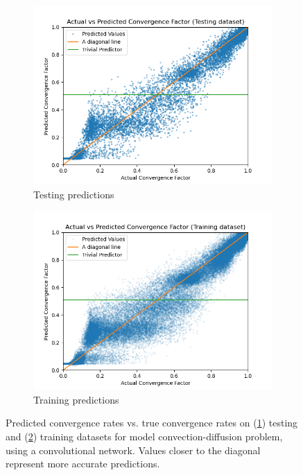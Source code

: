 \documentclass[review]{siamart190516}
\begin{document}
\begin{figure}[h]
  \centering
  \begin{subfigure}{.48\textwidth}
    \includegraphics[width=\textwidth]{figs/cd_conv_test_pred.png}
    \caption{Testing predictions}
    \label{subfig:cd_conv_test}
  \end{subfigure}
  \begin{subfigure}{.48\textwidth}
    \includegraphics[width=\textwidth]{figs/cd_conv_train_pred.png}
    \caption{Training predictions}
    \label{subfig:cd_conv_train}
  \end{subfigure}
  \caption{Predicted convergence rates vs. true convergence rates on (\ref{subfig:cd_conv_test}) testing and (\ref{subfig:cd_conv_train}) training datasets for model convection-diffusion problem, using a convolutional network. Values closer to the diagonal represent more accurate predictions. }
  \label{fig:cd_conv_pred}
\end{figure}
\end{document}

